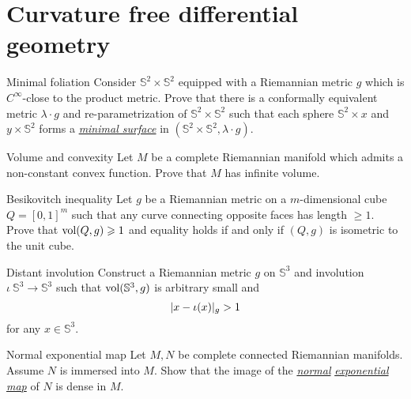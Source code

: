 \documentclass[twoside]{book}
\begin{document}
\chapter{Curvature free differential geometry}


\begin{pr}{\thm}{Minimal foliation}\label{gromomorphic-curves} 
Consider $\mathbb{S}^2\times \mathbb{S}^2$ equipped with a Riemannian metric $g$ 
which is $C^\infty$-close to the product metric. 
Prove that there is a conformally equivalent metric $\lambda\cdot g$ and re-parametrization of $\mathbb{S}^2\times \mathbb{S}^2$
such that each sphere $\mathbb{S}^2\times x$ and $y\times \mathbb{S}^2$ forms a 
\hyperref[Minimal surface]{\emph{minimal surface}} 
in $(\mathbb{S}^2\times \mathbb{S}^2,\lambda\cdot g)$.
\end{pr}


\begin{pr}{\thm}{Volume and convexity}
\label{Volume and convexity} 
Let
$M$ be a complete Riemannian manifold which admits a non-constant
convex function. Prove that $M$ has infinite volume.
\end{pr}

\begin{pr}{}{Besikovitch inequality}\label{Besikovitch inequality}
Let $g$ be a Riemannian metric on a $m$-dimensional cube $Q=[0,1]^m$ such that any curve connecting opposite faces has length $\ge 1$. 
Prove that $\operatorname{\rm vol}(Q,g)\geqslant 1$ and equality holds if and only if $(Q,g)$ is isometric to the unit cube.
\end{pr}

\begin{pr}{}{Distant involution}\label{Distant involution}
Construct a Riemannian metric $g$ on $\mathbb{S}^3$ and involution $\iota\:\mathbb{S}^3\to\mathbb{S}^3$ such that $\operatorname{\rm vol} (\mathbb{S}^3,g)$ is arbitrary small and 
\[|x\z-\iota(x)|_g>1\]
 for any $x\in\mathbb{S}^3$.
\end{pr}




\begin{pr}{\easy}{Normal exponential map}\label{Normal exponential map}
Let $M,N$ be complete connected Riemannian manifolds.
Assume $N$ is immersed into $M$.
Show that the image  of the 
\hyperref[Exponential map]{\emph{normal}} 
\hyperref[Exponential map]{\emph{exponential}} 
\hyperref[Exponential map]{\emph{map}} of $N$ is dense in $M$.
\end{pr}
\end{document}

